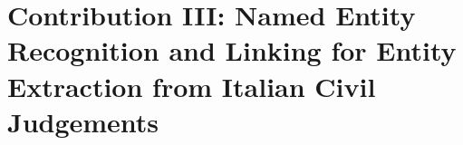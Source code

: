\section{Contribution III: Named Entity Recognition and Linking for Entity Extraction from Italian Civil Judgements}